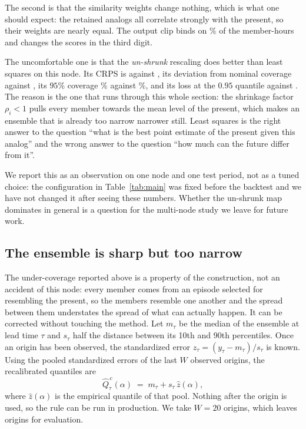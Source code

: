 \documentclass[12pt,a4paper]{article}
\begin{document}
The second is that the similarity weights change nothing, which is what one
should expect: the retained analogs all correlate strongly with the present,
so their weights are nearly equal. The output clip binds on \CLIPRATE\% of the
member-hours and changes the scores in the third digit.

The uncomfortable one is that the \emph{un-shrunk} rescaling does better than
least squares on this node. Its CRPS is \ABDUDCRPS{} against \ABOLSCRPS{}, its
deviation from nominal coverage \ABDUDREL{} against \ABOLSREL{}, its $95\%$
coverage \ABDUDCOV\% against \ABOLSCOV\%, and its loss at the $0.95$ quantile
\ABDUDPIN{} against \ABOLSPIN{}. The reason is the one that runs through this
whole section: the shrinkage factor $\rho_i<1$ pulls every member towards the
mean level of the present, which makes an ensemble that is already too narrow
narrower still. Least squares is the right answer to the question ``what is
the best point estimate of the present given this analog'' and the wrong answer
to the question ``how much can the future differ from it''.

We report this as an observation on one node and one test period, not as a
tuned choice: the configuration in Table~\ref{tab:main} was fixed before the
backtest and we have not changed it after seeing these numbers. Whether the
un-shrunk map dominates in general is a question for the multi-node study we
leave for future work.

\subsection{The ensemble is sharp but too narrow}
\label{sec:cal}

The under-coverage reported above is a property of the construction, not an
accident of this node: every member comes from an episode selected for
resembling the present, so the members resemble one another and the spread
between them understates the spread of what can actually happen. It can be
corrected without touching the method. Let $m_\tau$ be the median of the
ensemble at lead time $\tau$ and $s_\tau$ half the distance between its 10th
and 90th percentiles. Once an origin has been observed, the standardized error
$z_\tau=(y_\tau-m_\tau)/s_\tau$ is known. Using the pooled standardized errors
of the last $W$ observed origins, the recalibrated quantiles are
\begin{equation}
\hat Q^{\,c}_\tau(\alpha)\;=\;m_\tau+s_\tau\,\hat z(\alpha),
\label{eq:calib}
\end{equation}
where $\hat z(\alpha)$ is the empirical quantile of that pool. Nothing after
the origin is used, so the rule can be run in production. We take $W=20$
origins, which leaves \NCAL{} origins for evaluation.
\end{document}
